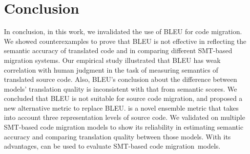 \section{Conclusion}
In conclusion, in this work, we invalidated the use of BLEU for code
migration. We showed counterexamples to prove that BLEU is not
effective in reflecting the semantic accuracy of translated code and
in comparing different SMT-based migration systems. Our empirical
study illustrated that BLEU has weak correlation with human judgment
in the task of measuring semantics of translated source code. Also,
BLEU's conclusion about the difference between models' translation
quality is inconsistent with that from semantic scores. We concluded
that BLEU is not suitable for source code migration, and proposed a
new alternative metric {\model} to replace BLEU. {\model} is a novel
ensemble metric that takes into account three representation levels of
source code. We validated {\model} on multiple SMT-based code
migration models to show its reliability in estimating semantic
accuracy and comparing translation quality between those models.  With
its advantages, {\model} can be used to evaluate SMT-based code
migration~models.
